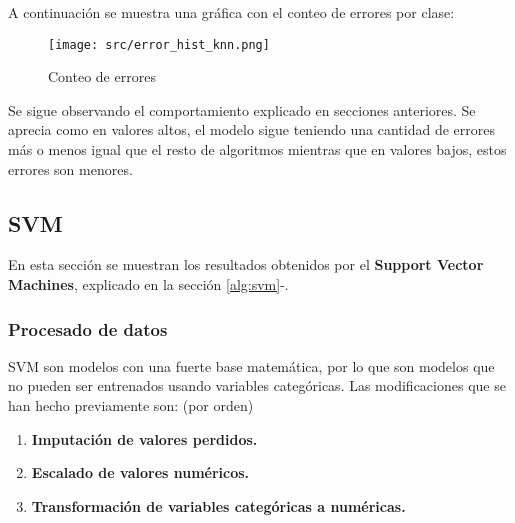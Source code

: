 \clearpage
A continuación se muestra una gráfica con el conteo de errores por clase:
\begin{figure}[H]
	\centering
	\texttt{[image: src/error\_hist\_knn.png]}
	\caption{Conteo de errores}
	\label{fig:knn_error_plot}
\end{figure}
Se sigue observando el comportamiento explicado en secciones anteriores. Se aprecia como en valores altos, el modelo sigue teniendo una cantidad de errores más o menos igual que el resto de algoritmos mientras que en valores bajos, estos errores son menores.
\clearpage
\subsection{SVM}
En esta sección se muestran los resultados obtenidos por el \textbf{Support Vector Machines}, explicado en la sección \ref{alg:svm}-.
\subsubsection*{Procesado de datos}
SVM son modelos con una fuerte base matemática, por lo que son modelos que no pueden ser entrenados usando variables categóricas.
Las modificaciones que se han hecho previamente son: (por orden)
\begin{enumerate}
	\item \textbf{Imputación de valores perdidos.}
	\item \textbf{Escalado de valores numéricos.}
	\item \textbf{Transformación de variables categóricas a numéricas.}
\end{enumerate}
